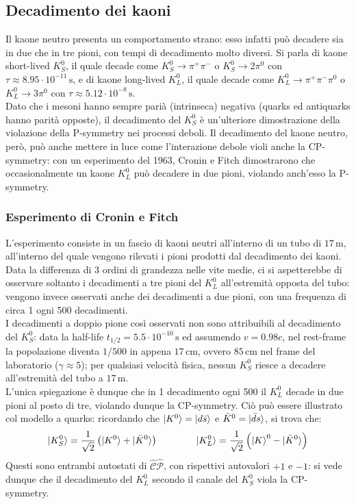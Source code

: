 \subsection{Decadimento dei kaoni}

Il kaone neutro presenta un comportamento strano: esso infatti può decadere sia in due che in tre pioni, con tempi di decadimento molto diversi. Si parla di kaone short-lived $ K^0_S $, il quale decade come $ K^0_S \rightarrow \pi^+ \pi^- $ o $ K^0_S \rightarrow 2\pi^0 $ con $ \tau \approx 8.95\cdot10^{-11}\,\text{s} $, e di kaone long-lived $ K^0_L $, il quale decade come $ K^0_L \rightarrow \pi^+ \pi^- \pi^0 $ o $ K^0_L \rightarrow 3\pi^0 $ con $ \tau \approx 5.12\cdot10^{-8}\,\text{s} $.\\
Dato che i mesoni hanno sempre parià (intrinseca) negativa (quarks ed antiquarks hanno parità opposte), il decadimento del $ K^0_S $ è un'ulteriore dimostrazione della violazione della P-symmetry nei processi deboli.
Il decadimento del kaone neutro, però, può anche mettere in luce come l'interazione debole violi anche la CP-symmetry: con un esperimento del 1963, Cronin e Fitch dimostrarono che occasionalmente un kaone $ K^0_L $ può decadere in due pioni, violando anch'esso la P-symmetry.

\subsubsection{Esperimento di Cronin e Fitch}

L'esperimento consiste in un fascio di kaoni neutri all'interno di un tubo di $ 17\,\text{m} $, all'interno del quale vengono rilevati i pioni prodotti dal decadimento dei kaoni. Data la differenza di 3 ordini di grandezza nelle vite medie, ci si aspetterebbe di osservare soltanto i decadimenti a tre pioni del $ K^0_L $ all'estremità opposta del tubo: vengono invece osservati anche dei decadimenti a due pioni, con una frequenza di circa 1 ogni 500 decadimenti.\\
I decadimenti a doppio pione così osservati non sono attribuibili al decadimento del $ K^0_S $: data la half-life $ t_{1/2} = 5.5\cdot10^{-10}\,\text{s} $ ed assumendo $ v = 0.98c $, nel rest-frame la popolazione diventa $ 1/500 $ in appena $ 17\,\text{cm} $, ovvero $ 85\,\text{cm} $ nel frame del laboratorio ($ \gamma \approx 5 $); per qualsiasi velocità fisica, nessun $ K^0_S $ riesce a decadere all'estremità del tubo a $ 17\,\text{m} $.\\
L'unica spiegazione è dunque che in 1 decadimento ogni 500 il $ K^0_L $ decade in due pioni al posto di tre, violando dunque la CP-symmetry. Ciò può essere illustrato col modello a quarks: ricordando che $ \ket{K^0} = \ket{d\bar{s}} $ e $ \bar{K}^0 = \ket{\bar{d}s} $, si trova che:
\begin{equation*}
	\ket{K^0_S} = \frac{1}{\sqrt{2}} \left( \ket{K^0} + \ket{\bar{K}^0} \right)
	\qquad \qquad
	\ket{K^0_L} = \frac{1}{\sqrt{2}} \left( \ket{K}^0 - \ket{\bar{K}^0} \right)
\end{equation*}
Questi sono entrambi autostati di $ \hat{\mathcal{C}}\hat{\mathcal{P}} $, con rispettivi autovalori $ +1 $ e $ -1 $: si vede dunque che il decadimento del $ K^0_L $ secondo il canale del $ K^0_S $ viola la CP-symmetry.

